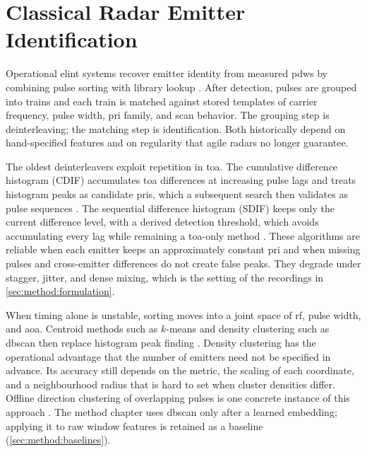 \section{Classical Radar Emitter Identification}\label{sec:related:classical}

Operational \gls{elint} systems recover emitter identity from measured \glspl{pdw} by combining pulse sorting with library lookup \parencite{wiley2006elint,skolnik2008radar}.
After detection, pulses are grouped into trains and each train is matched against stored templates of carrier frequency, pulse width, \gls{pri} family, and scan behavior.
The grouping step is deinterleaving; the matching step is identification.
Both historically depend on hand-specified features and on regularity that agile radars no longer guarantee.

The oldest deinterleavers exploit repetition in \gls{toa}.
The cumulative difference histogram (CDIF) accumulates \gls{toa} differences at increasing pulse lags and treats histogram peaks as candidate \glspl{pri}, which a subsequent search then validates as pulse sequences \parencite{mardia1989deinterleaving}.
The sequential difference histogram (SDIF) keeps only the current difference level, with a derived detection threshold, which avoids accumulating every lag while remaining a \gls{toa}-only method \parencite{milojevic1992sdif}.
These algorithms are reliable when each emitter keeps an approximately constant \gls{pri} and when missing pulses and cross-emitter differences do not create false peaks.
They degrade under stagger, jitter, and dense mixing, which is the setting of the recordings in \cref{sec:method:formulation}.

When timing alone is unstable, sorting moves into a joint space of \gls{rf}, pulse width, and \gls{aoa}.
Centroid methods such as \(k\)-means and density clustering such as \gls{dbscan} then replace histogram peak finding \parencite{ester1996density,qu2026radardeinterleavingreview}.
Density clustering has the operational advantage that the number of emitters need not be specified in advance.
Its accuracy still depends on the metric, the scaling of each coordinate, and a neighbourhood radius that is hard to set when cluster densities differ.
Offline direction clustering of overlapping pulses is one concrete instance of this approach \parencite{bedoire2022offlineclustering}.
The method chapter uses \gls{dbscan} only after a learned embedding; applying it to raw window features is retained as a baseline (\cref{sec:method:baselines}).

